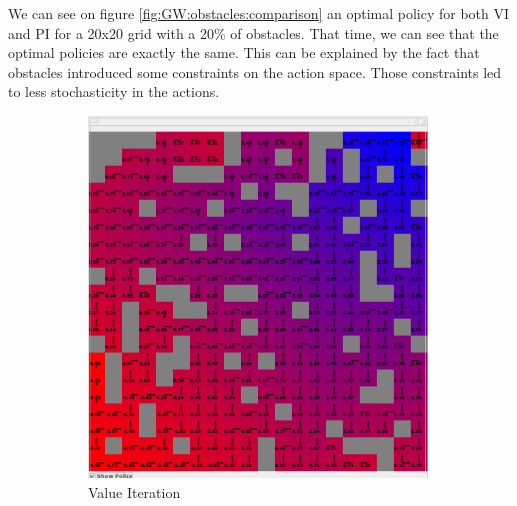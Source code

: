 \documentclass[10pt, twocolumn]{article}
\begin{document}
				We can see on figure \ref{fig:GW:obstacles:comparison} an optimal policy for both VI and PI for a 20x20 grid with a 20\% of obstacles. That time, we can see that the optimal policies are exactly the same. This can be explained by the fact that obstacles introduced some constraints on the action space. Those constraints led to less stochasticity in the actions.
				\begin{figure}[]
					\centering
					\begin{subfigure}[t]{0.24\textwidth}
						\centering
						\includegraphics[width=\textwidth]{../graphics/GridWorld_0.2_vi_wallpercent.png}
						\caption{Value Iteration}
						\label{fig:GW:obstacles:VI}
					\end{subfigure}
					\begin{subfigure}[t]{0.24\textwidth}
						\centering

\end{subfigure}
\end{figure}
\end{document}
